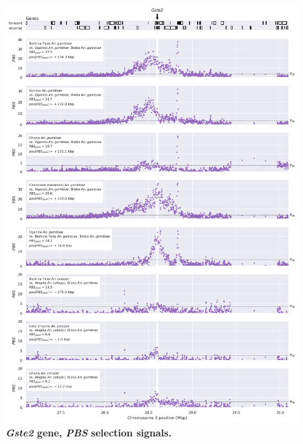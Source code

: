 \documentclass[a4paper,11pt,abstracton,hidelinks]{scrartcl}
\begin{document}
\clearpage
\begin{figure}[t!]
	\begin{center}
		\includegraphics*[width=1\linewidth,center]{artwork/locus_gste2_pbs_pdist.png}
	\end{center}
	\caption[\textit{Gste2} gene, \textit{PBS} selection signals]{
	\textbf{\textit{Gste2} gene, \textit{PBS} selection signals.} 
	} 
	\label{fig:locus_gste2_pbs}
\end{figure}


\clearpage
\end{document}
